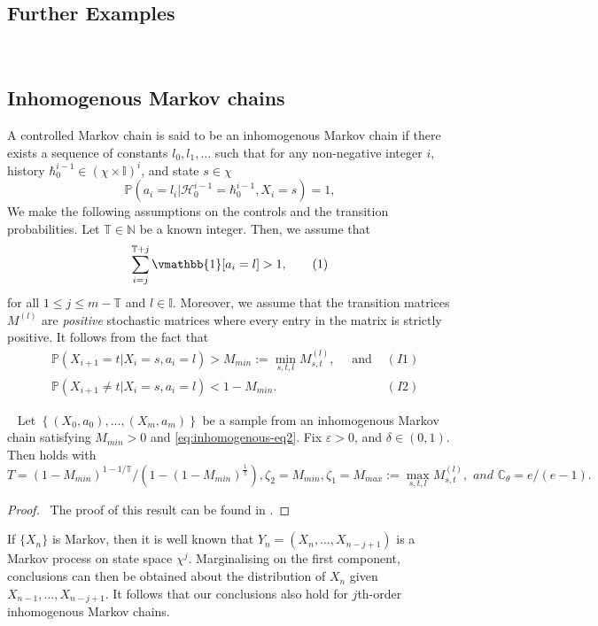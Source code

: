 \documentclass[opre,sglanonrev]{informs4}
\numberwithin{equation}{section}
\newcommand{\pow}[1]{^{(#1)}}
\newcommand{\lp}{\left(}
\newcommand{\rp}{\right)}
\newcommand{\History}{\mathcal{H}}
\newcommand{\history}{\hbar}
\newcommand{\Cbb}{\mathbb{C}}
\newcommand{\Ibb}{\mathbb{I}}
\newcommand{\Nbb}{\mathbb{N}}
\newcommand{\Pbb}{\mathbb{P}}
\newcommand{\Tbb}{\mathbb{T}}
\newcommand{\constant}{\Cbb}
\newcommand{\indexeddata}{\left\{(X_0,a_0),\dots,(X_m,a_m)\right\}}
\newcommand{\naturalset}{\Nbb}
\newcommand\numberthis{\addtocounter{equation}{1}\tag{\theequation}}
\newcommand{\prob}{\Pbb}
\newcommand{\indicator}{\vmathbb{1}}
\newcommand{\eps}{\varepsilon}
\renewcommand{\epsilon}{\eps}
\begin{document}
\begin{APPENDICES}
\section{Further Examples}~\label{sec:more-ex}
\subsection{Inhomogenous Markov chains}
A controlled Markov chain is said to be an inhomogenous Markov chain if there exists a sequence of constants $l_0,l_1,\dots$ such that for any non-negative integer $i$, history $\history_0^{i-1}\in(\chi\times\Ibb)^i$, and state $s\in\chi$
\[
\prob(a_i=l_i|\History_0^{i-1}=\history_0^{i-1},X_i=s)=1,
\]
\noindent We make the following assumptions on the controls and the transition probabilities. Let $\Tbb\in \naturalset$ be a known integer. Then, we assume that
\begin{align*}
    \sum_{i=j}^{\Tbb+j} \indicator[a_i=l]>1,\numberthis\label{eq:inhomogenous-eq2}
\end{align*}
for all $1\leq j\leq m-\Tbb$ and $l\in \Ibb$.
Moreover, we assume that the transition matrices $M\pow{l}$ are \textit{positive} stochastic matrices where every entry in the matrix is strictly positive. 
It follows from the fact that 
\begin{align*}
  &\prob\lp X_{i+1}=t|X_i=s,a_i=l\rp>M_{min}:=\min_{s,t,l} M_{s,t}\pow{l}, \quad \text{ and }& (I1)\\
  &\prob\lp X_{i+1}\neq t|X_i=s,a_i=l\rp<1-M_{min}.& (I2)
\end{align*}
\begin{proposition}~\label{prop:inhomogenous-mc}
Let $\indexeddata$ be a sample from an inhomogenous Markov chain satisfying $M_{min}>0$ and \cref{eq:inhomogenous-eq2}. Fix $\epsilon>0$, and $\delta \in (0,1)$. Then  holds with
\[
T=\lp1-M_{min}\rp^{1-1/\Tbb}/\lp{1-\lp1-M_{min}\rp^{\frac{1}{\Tbb}}}\rp,  \zeta_2=M_{min}, \zeta_1=M_{max}:=\max_{s,t,l}M_{s,t}\pow{l}, \textit{ and } \constant_{\theta}= e/(e-1).
\]
\end{proposition}
\begin{proof} \
The proof of this result can be found in .
\end{proof}
\begin{remark}
If $\{X_n\}$ is Markov, then it is well known that $Y_n=(X_n,\dots,X_{n-j+1})$ is a Markov process on state space $\chi^j$. Marginalising on the first component, conclusions can then be obtained about the distribution of $X_n$ given $X_{n-1},\dots,X_{n-j+1}$. It follows that our conclusions also hold for $j$th-order inhomogenous Markov chains.

\end{remark}
\end{APPENDICES}
\end{document}
